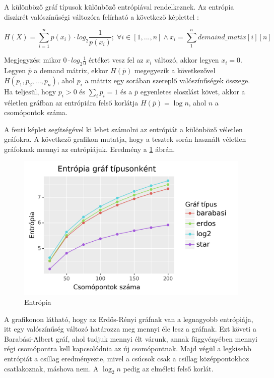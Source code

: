 \documentclass[12pt]{report}
\begin{document}
A különböző gráf típusok különböző entrópiával rendelkeznek.
Az entrópia diszkrét valószínűségi változóra felírható a következő képlettel \cite{DBLP:journals/corr/AvinMS17}:  

\[H(X) = \sum_{i=1}^{n} p(x_i) \cdot log_2\frac{1}{p(x_i)}; \; \forall i\in[1, ..., n] \land x_i = \sum_{1}^{n} demaind\_matix[i][n]\] 

Megjegyzés: mikor \(0\cdot log_2\frac{1}{0}\) értéket vesz fel az \(x_i\) változó, akkor legyen \(x_i=0\). 
Legyen \(\bar{p}\) a demand mátrix, ekkor \(H(\bar{p})\) megegyezik a következővel \(H(p_1, p_2, ..., p_n)\), ahol \(p_i\) a mátrix egy sorában szereplő valószínűségek összege.
Ha teljesül, hogy \(p_i > 0\) és $\sum_{i}p_i = 1$ és a \(\bar{p}\) egyenletes eloszlást követ, akkor a véletlen gráfban az entrópiára felső korlátja \(H(\bar{p}) = \log n\), ahol $n$ a csomópontok száma.

A fenti képlet segítségével ki lehet számolni az entrópiát a különböző véletlen gráfokra.
A következő grafikon mutatja, hogy a tesztek során használt véletlen gráfoknak mennyi az entrópiájuk.
Eredmény a \ref{entropy} ábrán.

\begin{figure}[H]
	\begin{center}
		\includegraphics[width=0.9\linewidth]{pictures/entropy.png}
		\caption{Entrópia}
		\label{entropy}
	\end{center}
\end{figure}

A grafikonon látható, hogy az Erdős-Rényi gráfnak van a legnagyobb entrópiája, itt egy valószínűség változó határozza meg mennyi éle lesz a gráfnak.
Ezt követi a Barabási-Albert gráf, ahol tudjuk mennyi élt várunk, annak függvényében mennyi régi csomópontra kell kapcsolódnia az új csomópontnak.
Majd végül a legkisebb entrópiát a csillag eredményezte, mivel a csúcsok csak a csillag középpontokhoz csatlakoznak, máshova nem.
A $\log_2n$ pedig az elméleti felső korlát.
\end{document}
